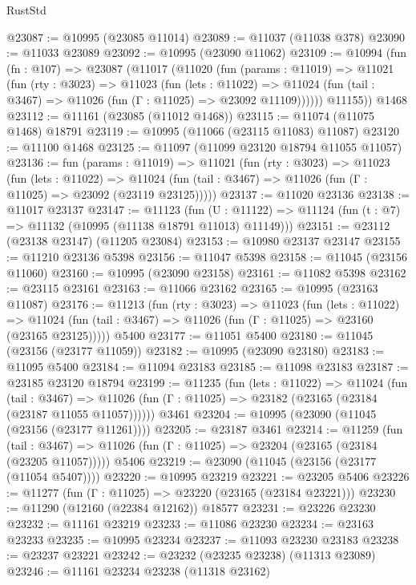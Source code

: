 \begin{lexlean}{RustStd}
\begin{coremodule}
@23087 := @10995 (@23085 @11014)
@23089 := @11037 (@11038 @378)
@23090 := @11033 @23089
@23092 := @10995 (@23090 @11062)
@23109 := @10994
    (fun (fn : @107) =>
    @23087
      (@11017
        (@11020
          (fun (params : @11019) =>
          @11021
            (fun (rty : @3023) =>
            @11023
              (fun (lets : @11022) =>
              @11024 (fun (tail : @3467) => @11026 (fun (Γ : @11025) => @23092 @11109))))))
        @11155))
    @1468
@23112 := @11161 (@23085 (@11012 @1468))
@23115 := @11074 (@11075 @1468) @18791
@23119 := @10995 (@11066 (@23115 @11083) @11087)
@23120 := @11100 @1468
@23125 := @11097 (@11099 @23120 @18794 @11055 @11057)
@23136 := fun (params : @11019) =>
  @11021
    (fun (rty : @3023) =>
    @11023
      (fun (lets : @11022) =>
      @11024 (fun (tail : @3467) => @11026 (fun (Γ : @11025) => @23092 (@23119 @23125)))))
@23137 := @11020 @23136
@23138 := @11017 @23137
@23147 := @11123
    (fun (U : @11122) => @11124 (fun (t : @7) => @11132 (@10995 (@11138 @18791 @11013) @11149)))
@23151 := @23112 (@23138 @23147) (@11205 @23084)
@23153 := @10980 @23137 @23147
@23155 := @11210 @23136 @5398
@23156 := @11047 @5398
@23158 := @11045 (@23156 @11060)
@23160 := @10995 (@23090 @23158)
@23161 := @11082 @5398
@23162 := @23115 @23161
@23163 := @11066 @23162
@23165 := @10995 (@23163 @11087)
@23176 := @11213
    (fun (rty : @3023) =>
    @11023
      (fun (lets : @11022) =>
      @11024 (fun (tail : @3467) => @11026 (fun (Γ : @11025) => @23160 (@23165 @23125)))))
    @5400
@23177 := @11051 @5400
@23180 := @11045 (@23156 (@23177 @11059))
@23182 := @10995 (@23090 @23180)
@23183 := @11095 @5400
@23184 := @11094 @23183
@23185 := @11098 @23183
@23187 := @23185 @23120 @18794
@23199 := @11235
    (fun (lets : @11022) =>
    @11024
      (fun (tail : @3467) =>
      @11026 (fun (Γ : @11025) => @23182 (@23165 (@23184 (@23187 @11055 @11057))))))
    @3461
@23204 := @10995 (@23090 (@11045 (@23156 (@23177 @11261))))
@23205 := @23187 @3461
@23214 := @11259
    (fun (tail : @3467) => @11026 (fun (Γ : @11025) => @23204 (@23165 (@23184 (@23205 @11057)))))
    @5406
@23219 := @23090 (@11045 (@23156 (@23177 (@11054 @5407))))
@23220 := @10995 @23219
@23221 := @23205 @5406
@23226 := @11277 (fun (Γ : @11025) => @23220 (@23165 (@23184 @23221)))
@23230 := @11290 (@12160 (@22384 @12162)) @18577
@23231 := @23226 @23230
@23232 := @11161 @23219
@23233 := @11086 @23230
@23234 := @23163 @23233
@23235 := @10995 @23234
@23237 := @11093 @23230 @23183
@23238 := @23237 @23221
@23242 := @23232 (@23235 @23238) (@11313 @23089)
@23246 := @11161 @23234 @23238 (@11318 @23162)

\end{coremodule}
\end{lexlean}
